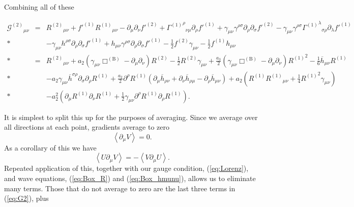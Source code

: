 \documentclass[aps,prd,amsfonts,amssymb,amsmath,nofootinbib,reprint,showpacs]{revtex4-1}
\newcommand{\eqnref}[1]{(\ref{eq:#1})}
\newcommand{\recip}[1]{\ensuremath{\frac{1}{#1}}}
\begin{document}
Combining all of these
\begin{widetext}
\begin{eqnarray}
{\mathcal{G}^{(2)}}_{\mu\nu} & = & {R^{(2)}}_{\mu\nu} + f'^{(1)}{R^{(1)}}_{\mu\nu} - \partial_\mu\partial_\nu f'^{(2)} + {{\Gamma^{(1)}}^\rho}_{\nu\mu}\partial_\rho f'^{(1)} + \gamma_{\mu\nu}\gamma^{\rho\sigma}\partial_\rho\partial_\sigma f'^{(2)} - \gamma_{\mu\nu}\gamma^{\rho\sigma}{{\Gamma^{(1)}}^\lambda}_{\sigma\rho}\partial_\lambda f'^{(1)} \nonumber \\*
 & & - {} \gamma_{\mu\nu}h^{\rho\sigma}\partial_\rho\partial_\sigma f'^{(1)} + h_{\mu\nu}\gamma^{\rho\sigma}\partial_\rho\partial_\sigma f'^{(1)} - \recip{2}f^{(2)}\gamma_{\mu\nu} - \recip{2}f^{(1)}h_{\mu\nu} \nonumber \\*
 & = & {R^{(2)}}_{\mu\nu} + a_2\left(\gamma_{\mu\nu}\Box^{(\text{B})} - \partial_\mu\partial_\nu\right)R^{(2)} - \recip{2}R^{(2)}\gamma_{\mu\nu} + \frac{a_3}{2}\left(\gamma_{\mu\nu}\Box^{(\text{B})} - \partial_\mu\partial_\nu\right){R^{(1)}}^2 - \recip{6}\overline{h}_{\mu\nu}R^{(1)} \nonumber \\*
 & & - {} a_2\gamma_{\mu\nu}\overline{h}^{\sigma\rho}\partial_\sigma\partial_\rho R^{(1)} + \frac{a_2}{2} \partial^\rho R^{(1)} \left(\partial_\mu\overline{h}_{\rho\nu} + \partial_\nu\overline{h}_{\rho\mu} - \partial_\rho\overline{h}_{\mu\nu}\right) + a_2\left(R^{(1)}{R^{(1)}}_{\mu\nu} + \recip{4}{R^{(1)}}^2\gamma_{\mu\nu}\right) \nonumber \\*
 & & - {} a_2^2\left(\partial_\mu R^{(1)}\partial_\nu R^{(1)} + \recip{2} \gamma_{\mu\nu}\partial^\rho R^{(1)}\partial_\rho R^{(1)}\right).
 \label{eq:G2}
\end{eqnarray}
\end{widetext}
It is simplest to split this up for the purposes of averaging. Since we average over all directions at each point, gradients average to zero~\cite{Hobson2006, Stein2011}
\begin{equation}
\left\langle\partial_\mu V\right\rangle = 0.
\end{equation}
As a corollary of this we have
\begin{equation}
\left\langle U\partial_\mu V\right\rangle = -\left\langle V \partial_\mu U\right\rangle.
\end{equation}
Repeated application of this, together with our gauge condition, \eqnref{Lorenz}, and wave equations, \eqnref{Box_R} and \eqnref{Box_hmunu}, allows us to eliminate many terms. Those that do not average to zero are the last three terms in \eqnref{G2}, plus
\end{document}
